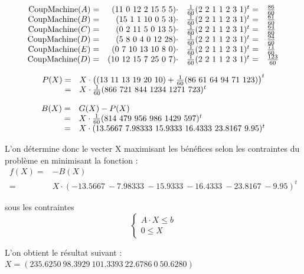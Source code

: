 \documentclass[a4paper, 11pt]{article}
\begin{document}
$$
\begin{array}{r r l l}
    \mbox{CoupMachine}(A) = & (11~0~12~2~15~5~5)\cdot  & \frac{1}{60}(2~2~1~1~2~3~1)^t = & \frac{86}{60} \\
    \mbox{CoupMachine}(B) = & (15~1~1~10~0~5~3)\cdot   & \frac{1}{60}(2~2~1~1~2~3~1)^t = & \frac{61}{60} \\
    \mbox{CoupMachine}(C) = & (0~2~11~5~0~13~5)\cdot   & \frac{1}{60}(2~2~1~1~2~3~1)^t = & \frac{64}{60} \\
    \mbox{CoupMachine}(D) = & (5~8~0~4~0~12~28)\cdot   & \frac{1}{60}(2~2~1~1~2~3~1)^t = & \frac{94}{60} \\
    \mbox{CoupMachine}(E) = & (0~7~10~13~10~8~0)\cdot  & \frac{1}{60}(2~2~1~1~2~3~1)^t = & \frac{71}{60} \\
    \mbox{CoupMachine}(D) = & (10~12~15~7~25~0~7)\cdot & \frac{1}{60}(2~2~1~1~2~3~1)^t = & \frac{123}{60} \\
\end{array}
$$

$$
\begin{array}{r l}
    P(X) = & X\cdot\left((13~11~13~19~20~10) + \frac{1}{60}(86~61~64~94~71~123)\right)^t \\
    = & X\cdot\frac{1}{60}(866~721~844~1234~1271~723)^t \\
\end{array}
$$

$$
\begin{array}{r l}
    B(X) = & G(X) - P(X) \\
    = & X\cdot\frac{1}{60}(814~479~956~986~1429~597)^t \\
    = & X\cdot(13.5667~7.98333~15.9333~16.4333~23.8167~9.95)^t \\
\end{array}
$$

L'on détermine donc le vecter X maximisant les bénéfices selon les contraintes du problème en minimisant la fonction :\\
$$
\begin{array}{rl}
    f(X) = & -B(X) \\
    = & X\cdot(-13.5667~-7.98333~-15.9333~-16.4333~-23.8167~-9.95)^t
\end{array}
$$

sous les contraintes
$$
\left\{\begin{split}
    A\cdot X \leq b\\
    0 \leq X
\end{split}\right.
$$

L'on obtient le résultat suivant : \\
$ X = (235.6250~98.3929~101.3393~22.6786~0~50.6280) $ \\
\end{document}
